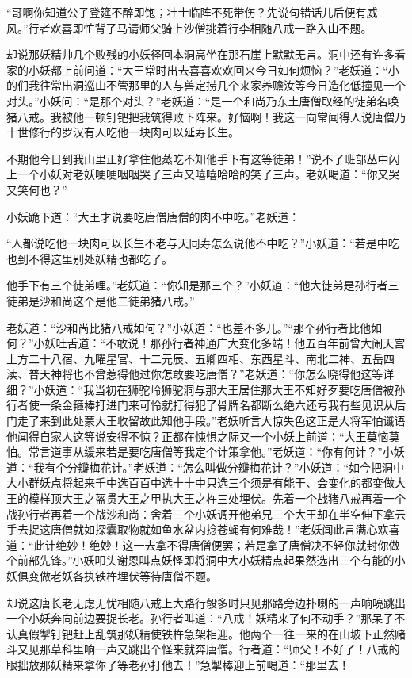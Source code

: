 \documentclass[12pt,UTF8]{ctexbook}
\begin{document}
{	“哥啊你知道公子登筵不醉即饱；壮士临阵不死带伤？先说句错话儿后便有威风。”行者欢喜即忙背了马请师父骑上沙僧挑着行李相随八戒一路入山不题。
	
	却说那妖精帅几个败残的小妖径回本洞高坐在那石崖上默默无言。洞中还有许多看家的小妖都上前问道：“大王常时出去喜喜欢欢回来今日如何烦恼？”老妖道：“小的们我往常出洞巡山不管那里的人与兽定捞几个来家养赡汝等今日造化低撞见一个对头。”小妖问：“是那个对头？”老妖道：“是一个和尚乃东土唐僧取经的徒弟名唤猪八戒。我被他一顿钉钯把我筑得败下阵来。好恼啊！我这一向常闻得人说唐僧乃十世修行的罗汉有人吃他一块肉可以延寿长生。
	
	不期他今日到我山里正好拿住他蒸吃不知他手下有这等徒弟！”说不了班部丛中闪上一个小妖对老妖哽哽咽咽哭了三声又嘻嘻哈哈的笑了三声。老妖喝道：“你又哭又笑何也？”
	
	小妖跪下道：“大王才说要吃唐僧唐僧的肉不中吃。”老妖道：
	
	“人都说吃他一块肉可以长生不老与天同寿怎么说他不中吃？”小妖道：“若是中吃也到不得这里别处妖精也都吃了。
	
	他手下有三个徒弟哩。”老妖道：“你知是那三个？”小妖道：“他大徒弟是孙行者三徒弟是沙和尚这个是他二徒弟猪八戒。”
	
	老妖道：“沙和尚比猪八戒如何？”小妖道：“也差不多儿。”“那个孙行者比他如何？”小妖吐舌道：“不敢说！那孙行者神通广大变化多端！他五百年前曾大闹天宫上方二十八宿、九曜星官、十二元辰、五卿四相、东西星斗、南北二神、五岳四渎、普天神将也不曾惹得他过你怎敢要吃唐僧？”老妖道：“你怎么晓得他这等详细？”小妖道：“我当初在狮驼岭狮驼洞与那大王居住那大王不知好歹要吃唐僧被孙行者使一条金箍棒打进门来可怜就打得犯了骨牌名都断么绝六还亏我有些见识从后门走了来到此处蒙大王收留故此知他手段。”老妖听言大惊失色这正是大将军怕谶语他闻得自家人这等说安得不惊？正都在悚惧之际又一个小妖上前道：“大王莫恼莫怕。常言道事从缓来若是要吃唐僧等我定个计策拿他。”老妖道：“你有何计？”小妖道：“我有个分瓣梅花计。”老妖道：“怎么叫做分瓣梅花计？”小妖道：“如今把洞中大小群妖点将起来千中选百百中选十十中只选三个须是有能干、会变化的都变做大王的模样顶大王之盔贯大王之甲执大王之杵三处埋伏。先着一个战猪八戒再着一个战孙行者再着一个战沙和尚：舍着三个小妖调开他弟兄三个大王却在半空伸下拿云手去捉这唐僧就如探囊取物就如鱼水盆内捻苍蝇有何难哉！”老妖闻此言满心欢喜道：“此计绝妙！绝妙！这一去拿不得唐僧便罢；若是拿了唐僧决不轻你就封你做个前部先锋。”小妖叩头谢恩叫点妖怪即将洞中大小妖精点起果然选出三个有能的小妖俱变做老妖各执铁杵埋伏等待唐僧不题。
	
	却说这唐长老无虑无忧相随八戒上大路行彀多时只见那路旁边扑喇的一声响喨跳出一个小妖奔向前边要捉长老。孙行者叫道：“八戒！妖精来了何不动手？”那呆子不认真假掣钉钯赶上乱筑那妖精使铁杵急架相迎。他两个一往一来的在山坡下正然赌斗又见那草科里响一声又跳出个怪来就奔唐僧。行者道：“师父！不好了！八戒的眼拙放那妖精来拿你了等老孙打他去！”急掣棒迎上前喝道：“那里去！
	
}
\end{document}
